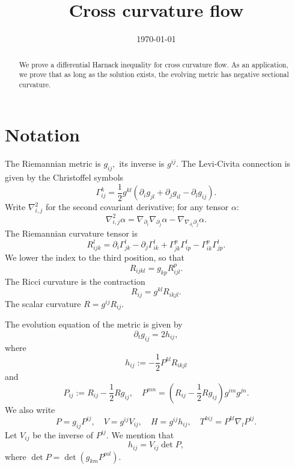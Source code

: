 \documentclass{amsart}
\theoremstyle{definition}
\theoremstyle{remark}
\numberwithin{equation}{section}
\begin{document}
\title[Cross curvature flow]
 {Cross curvature flow}

\curraddr{}
\email{}
\date{\today}

\dedicatory{}
\subjclass[2010]{}
\keywords{}

\begin{abstract}
We prove a differential Harnack inequality for cross curvature flow. As an application, we prove that as long as the solution exists, the evolving metric has negative sectional curvature.
\end{abstract}

\maketitle

\section{Notation}
The Riemannian metric is $g_{ij},$ its inverse is $g^{ij}$. The Levi-Civita connection is given by the Christoffel symbols
\begin{equation}
\Gamma_{ij}^k=\frac{1}{2}g^{kl}\left(\partial_ig_{jl}+\partial_jg_{il}-\partial_lg_{ij}\right).
\end{equation}
Write $\nabla^2_{i,j}$ for the second covariant derivative; for any tensor $\alpha:$
\[\nabla^2_{i,j}\alpha=\nabla_{\partial_i}\nabla_{\partial_j}\alpha-\nabla_{\nabla_{\partial_i}\partial_j}\alpha.\]
The Riemannian curvature tensor is
\begin{equation}
R_{ijk}^l=\partial_i\Gamma_{jk}^l-\partial_j\Gamma_{ik}^l+\Gamma_{jk}^p\Gamma_{ip}^l-\Gamma_{ik}^p\Gamma_{jp}^l.
\end{equation}
We lower the index to the third position, so that
\begin{equation}
R_{ijkl}=g_{kp}R_{ijl}^p.
\end{equation}
The Ricci curvature is the contraction
\begin{equation}
R_{ij}=g^{kl}R_{ikjl}.
\end{equation}
The scalar curvature $R=g^{ij}R_{ij}.$


The evolution equation of the metric is given by
\begin{equation}
\partial_tg_{ij}=2h_{ij},
\end{equation}
where
\begin{equation}
h_{ij}:=-\frac{1}{2}P^{kl}R_{ikjl}
\end{equation}
and
\begin{equation}
P_{ij}:=R_{ij}-\frac{1}{2}Rg_{ij},\quad
P^{mn}=\left(R_{ij}-\frac{1}{2}Rg_{ij}\right)g^{im}g^{jn}.
\end{equation}
We also write
\begin{equation}
P=g_{ij}P^{ij},\quad V=g^{ij}V_{ij},\quad H=g^{ij}h_{ij},\quad  T^{kij}=P^{kl}\nabla_l P^{ij}.
\end{equation}
Let $V_{ij}$ be the inverse of $P^{ij}$. We mention that
\begin{equation}
h_{ij}=V_{ij}\det P,
\end{equation}
where $\det P = \det (g_{km} P^{ml}).$
\end{document}
